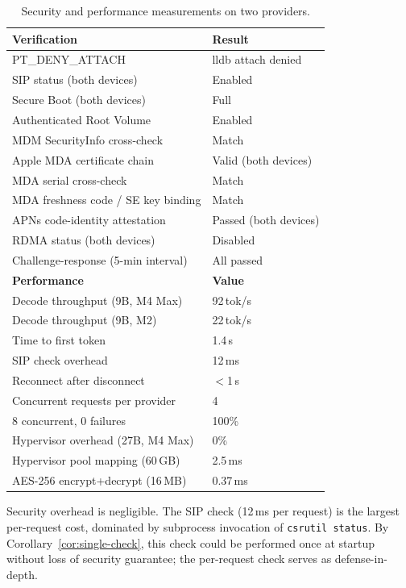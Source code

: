 \documentclass[10pt,twocolumn,letterpaper]{article}
\begin{document}
\begin{table}[h]
\centering
\caption{Security and performance measurements on two providers.}
\vspace{4pt}
\small
\begin{tabular}{@{}ll@{}}
\toprule
\textbf{Verification} & \textbf{Result} \\
\midrule
PT\_DENY\_ATTACH & lldb attach denied \\
SIP status (both devices) & Enabled \\
Secure Boot (both devices) & Full \\
Authenticated Root Volume & Enabled \\
MDM SecurityInfo cross-check & Match \\
Apple MDA certificate chain & Valid (both devices) \\
MDA serial cross-check & Match \\
MDA freshness code / SE key binding & Match \\
APNs code-identity attestation & Passed (both devices) \\
RDMA status (both devices) & Disabled \\
Challenge-response (5-min interval) & All passed \\
\midrule
\textbf{Performance} & \textbf{Value} \\
\midrule
Decode throughput (9B, M4 Max) & 92\,tok/s \\
Decode throughput (9B, M2) & 22\,tok/s \\
Time to first token & 1.4\,s \\
SIP check overhead & 12\,ms \\
Reconnect after disconnect & $<$1\,s \\
Concurrent requests per provider & 4 \\
8 concurrent, 0 failures & 100\% \\
Hypervisor overhead (27B, M4 Max) & 0\% \\
Hypervisor pool mapping (60\,GB) & 2.5\,ms \\
AES-256 encrypt+decrypt (16\,MB) & 0.37\,ms \\
\bottomrule
\end{tabular}
\end{table}

Security overhead is negligible. The SIP check (12\,ms per request) is the largest per-request cost, dominated by subprocess invocation of \texttt{csrutil status}. By Corollary~\ref{cor:single-check}, this check could be performed once at startup without loss of security guarantee; the per-request check serves as defense-in-depth.
\end{document}
